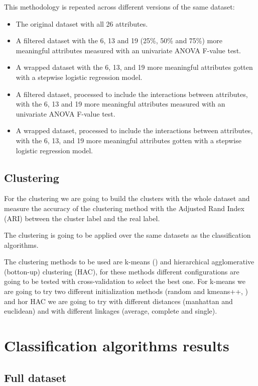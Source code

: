 \documentclass[a4paper,11pt]{article}
\begin{document}
This methodology is repeated across different versions of the same dataset:

\begin{itemize}
	\item The original dataset with all 26 attributes.
	\item A filtered dataset with the 6, 13 and 19 (25\%, 50\% and 75\%) more meaningful attributes measured with an univariate ANOVA F-value test.
	\item A wrapped dataset with the 6, 13, and 19 more meaningful attributes gotten with a stepwise logistic regression model.
	\item A filtered dataset, processed to include the interactions between attributes, with the 6, 13 and 19 more meaningful attributes  measured with an univariate ANOVA F-value test.
	\item A wrapped dataset, processed to include the interactions between attributes, with the 6, 13, and 19 more meaningful attributes gotten with a stepwise logistic regression model.
\end{itemize}

\subsection{Clustering}

For the clustering we are going to build the clusters with the whole dataset and measure the accuracy of the clustering method with the Adjusted Rand Index (ARI) between the cluster label and the real label.

The clustering is going to be applied over the same datasets as the classification algorithms.

The clustering methods to be used are k-means (\cite{forgy1968}) and hierarchical agglomerative (botton-up) clustering (HAC), for these methods different configurations are going to be tested with cross-validation to select the best one. For k-means we are going to try two different initialization methods (random and kmeans++, \cite{arthur2007}) and hor HAC we are going to try with different distances (manhattan and euclidean) and with different linkages (average, complete and single).

\section{Classification algorithms results}

\subsection{Full dataset}
\end{document}
